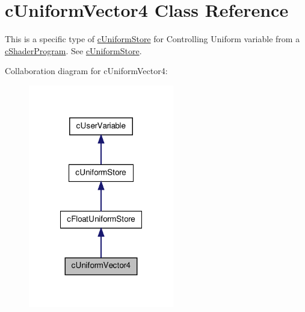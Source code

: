 \hypertarget{classc_uniform_vector4}{
\section{cUniformVector4 Class Reference}
\label{classc_uniform_vector4}
}


This is a specific type of \hyperlink{classc_uniform_store}{cUniformStore} for Controlling Uniform variable from a \hyperlink{classc_shader_program}{cShaderProgram}. See \hyperlink{classc_uniform_store}{cUniformStore}.  




Collaboration diagram for cUniformVector4:\nopagebreak
\begin{figure}[H]
\begin{center}
\leavevmode
\includegraphics[width=180pt]{classc_uniform_vector4__coll__graph}
\end{center}
\end{figure}
